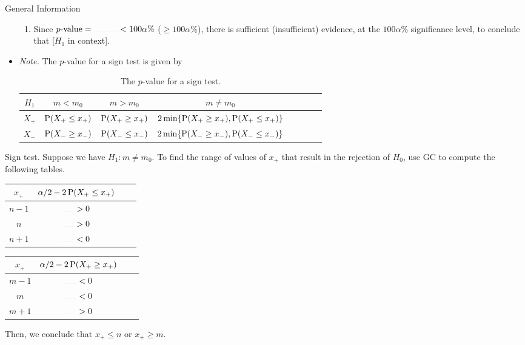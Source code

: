 \documentclass[../Notes.tex]{subfiles}
\begin{document}
\begin{stbox}{General Information}
\begin{itemize}
\begin{enumerate}
      \item Since \(p\text{-value}=\rule{1cm}{0.01mm}<100\alpha\%\) (\(\geq 100\alpha\%\)), there is sufficient (insufficient) evidence, at the \(100\alpha\%\) significance level, to conclude that [\(H_1\) in context].
    \end{enumerate}
    \item \emph{Note.} The \(p\)-value for a sign test is given by
    \begin{table}[H]
      \centering
      \begin{tabular}{ScScScSc}
        \toprule
        \(H_1\) & \(m<m_0\) & \(m>m_0\) & \(m\neq m_0\)\\
        \midrule
        \(X_{+}\) & \(\operatorname{P}(X_{+}\leq x_{+})\) & \(\operatorname{P}(X_{+}\geq x_{+})\) & \(2\min\{\operatorname{P}(X_{+}\geq x_{+}),\operatorname{P}(X_{+}\leq x_{+})\}\)\\
        \midrule
        \(X_{-}\) & \(\operatorname{P}(X_{-}\geq x_{-})\) & \(\operatorname{P}(X_{-}\leq x_{-})\) & \(2\min\{\operatorname{P}(X_{-}\geq x_{-}),\operatorname{P}(X_{-}\leq x_{-})\}\)\\
        \bottomrule
      \end{tabular}
      \caption{The \(p\)-value for a sign test.}
      \label{table:sign-test-p-value}
    \end{table}
  \end{itemize}
\end{stbox}
\begin{note}
  Sign test. Suppose we have \(H_1\colon m\neq m_0\). To find the range of values of \(x_{+}\) that result in the rejection of \(H_0\), use GC to compute the following tables.
  \begin{table}[H]
    \centering
    \begin{tabular}{|Sc|Sc|}
      \hline
      \(x_{+}\) & \(\alpha/2-2\operatorname{P}(X_{+}\leq x_{+})\)\\
      \hline
      \(n-1\) & \(\rule{0.5cm}{0.01mm}>0\)\\
      \hline
      \(n\) & \(\rule{0.5cm}{0.01mm}>0\)\\
      \hline
      \(n+1\) & \(\rule{0.5cm}{0.01mm}<0\)\\
      \hline
    \end{tabular}\hspace{1cm}
    \begin{tabular}{|Sc|Sc|}
      \hline
      \(x_{+}\) & \(\alpha/2-2\operatorname{P}(X_{+}\geq x_{+})\)\\
      \hline
      \(m-1\) & \(\rule{0.5cm}{0.01mm}<0\)\\
      \hline
      \(m\) & \(\rule{0.5cm}{0.01mm}<0\)\\
      \hline
      \(m+1\) & \(\rule{0.5cm}{0.01mm}>0\)\\
      \hline
    \end{tabular} 
  \end{table}
  Then, we conclude that \(x_{+}\leq n\) or \(x_{+}\geq m\).
\end{note}
\end{document}
